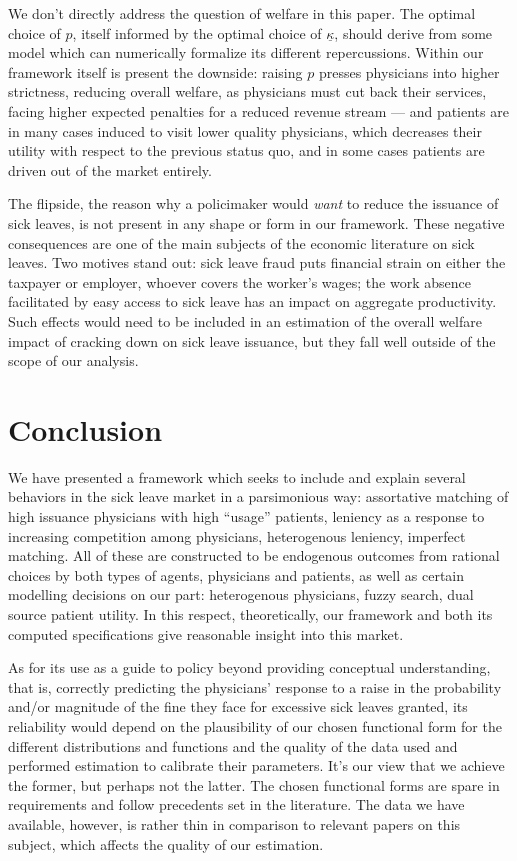 \documentclass[../main.tex]{subfiles}
\begin{document}
We don't directly address the question of welfare in this paper. The optimal choice of $p$, itself informed by the optimal choice of $\underline{\kappa}$, should derive from some model which can numerically formalize its different repercussions. Within our framework itself is present the downside: raising $p$ presses physicians into higher strictness, reducing overall welfare, as physicians must cut back their services, facing higher expected penalties for a reduced revenue stream — and patients are in many cases induced to visit lower quality physicians, which decreases their utility with respect to the previous status quo, and in some cases patients are driven out of the market entirely.

The flipside, the reason why a policimaker would \textit{want} to reduce the issuance of sick leaves, is not present in any shape or form in our framework. These negative consequences are one of the main subjects of the economic literature on sick leaves. Two motives stand out: sick leave fraud puts financial strain on either the taxpayer or employer, whoever covers the worker's wages; the work absence facilitated by easy access to sick leave has an impact on aggregate productivity. Such effects would need to be included in an estimation of the overall welfare impact of cracking down on sick leave issuance, but they fall well outside of the scope of our analysis.

\section{Conclusion}

We have presented a framework which seeks to include and explain several behaviors in the sick leave market in a parsimonious way: assortative matching of high issuance physicians with high ``usage'' patients, leniency as a response to increasing competition among physicians, heterogenous leniency, imperfect matching. All of these are constructed to be endogenous outcomes from rational choices by both types of agents, physicians and patients, as well as certain modelling decisions on our part: heterogenous physicians, fuzzy search, dual source patient utility. In this respect, theoretically, our framework and both its computed specifications give reasonable insight into this market.

As for its use as a guide to policy beyond providing conceptual understanding, that is, correctly predicting the physicians' response to a raise in the probability and/or magnitude of the fine they face for excessive sick leaves granted, its reliability would depend on the plausibility of our chosen functional form for the different distributions and functions and the quality of the data used and performed estimation to calibrate their parameters. It's our view that we achieve the former, but perhaps not the latter. The chosen functional forms are spare in requirements and follow precedents set in the literature. The data we have available, however, is rather thin in comparison to relevant papers on this subject, which affects the quality of our estimation.
\end{document}
